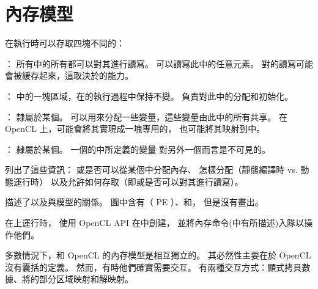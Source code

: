 
\section{內存模型}
在執行時可以存取四塊不同的：

\startigBase
\item {}：
所有中的所有都可以對其進行讀寫。
可以讀寫此中的任意元素。
對的讀寫可能會被緩存起來，這取決於的能力。

\item {}：
中的一塊區域，在的執行過程中保持不變。
負責對此中的分配和初始化。

\item {}：
隸屬於某個。
可以用來分配一些變量，這些變量由此中的所有共享。
在 OpenCL 上，可能會將其實現成一塊專用的，
也可能將其映射到中。

\item {}：
隸屬於某個。
一個的中所定義的變量
對另外一個而言是不可見的。
\stopigBase

列出了這些資訊：
或是否可以從某個中分配內存、
怎樣分配（靜態編譯時 vs. 動態運行時）
以及允許如何存取（即或是否可以對其進行讀寫）。


描述了以及與模型的關係。
圖中含有（ PE ）、和，
但是沒有畫出。


{}

在上運行時，
使用 OpenCL API 在中創建，
並將內存命令(中有所描述)入隊以操作他們。

多數情況下，和 OpenCL 的內存模型是相互獨立的。
其必然性主要在於 OpenCL 沒有囊括的定義。
然而，有時他們確實需要交互。
有兩種交互方式：顯式拷貝數據、將的部分区域映射和解映射。

